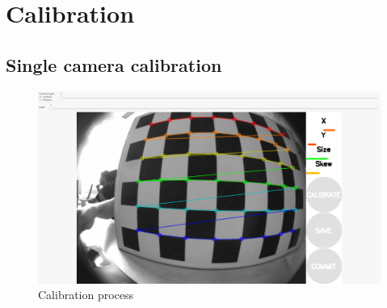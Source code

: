 \section{Calibration}
\subsection{Single camera calibration}

\begin{figure}[h]
    \centering
    \includegraphics[width=.6\textwidth]{graphics/calibration.png}
    \caption{Calibration process}
    \label{fig:calib}
\end{figure}

